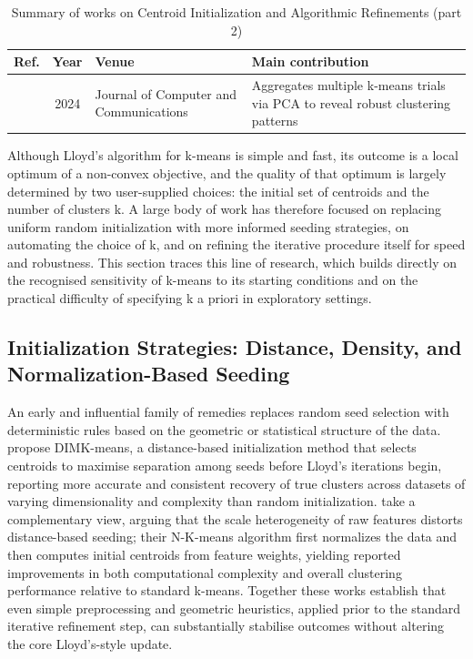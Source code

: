 \begin{table}[!t]
\centering
\renewcommand{\arraystretch}{1.2}
\caption{Summary of works on Centroid Initialization and Algorithmic Refinements (part 2)}
\begin{tabularx}{\textwidth}{@{}l c p{3.6cm} X@{}}
\toprule
\textbf{Ref.} & \textbf{Year} & \textbf{Venue} & \textbf{Main contribution} \\
\midrule
\cite{xiao2024comprehensive} & 2024 & Journal of Computer and Communications & Aggregates multiple k-means trials via PCA to reveal robust clustering patterns \\
\bottomrule
\end{tabularx}
\end{table}

Although Lloyd's algorithm for k-means is simple and fast, its outcome is a local optimum of a non-convex objective, and the quality of that optimum is largely determined by two user-supplied choices: the initial set of centroids and the number of clusters k. A large body of work has therefore focused on replacing uniform random initialization with more informed seeding strategies, on automating the choice of k, and on refining the iterative procedure itself for speed and robustness. This section traces this line of research, which builds directly on the recognised sensitivity of k-means to its starting conditions and on the practical difficulty of specifying k a priori in exploratory settings.

\subsection{Initialization Strategies: Distance, Density, and Normalization-Based Seeding}
An early and influential family of remedies replaces random seed selection with deterministic rules based on the geometric or statistical structure of the data. \cite{aldahdooh2013dimk} propose DIMK-means, a distance-based initialization method that selects centroids to maximise separation among seeds before Lloyd's iterations begin, reporting more accurate and consistent recovery of true clusters across datasets of varying dimensionality and complexity than random initialization. \cite{virmani2015normalization} take a complementary view, arguing that the scale heterogeneity of raw features distorts distance-based seeding; their N-K-means algorithm first normalizes the data and then computes initial centroids from feature weights, yielding reported improvements in both computational complexity and overall clustering performance relative to standard k-means. Together these works establish that even simple preprocessing and geometric heuristics, applied prior to the standard iterative refinement step, can substantially stabilise outcomes without altering the core Lloyd's-style update.

